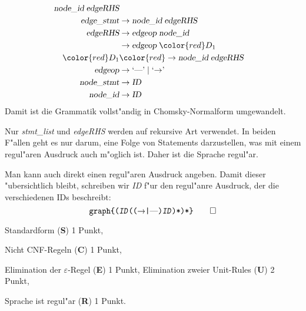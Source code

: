 \begin{loesung}
\begin{teilaufgaben}
\begin{align*}
                                \textsl{node\_id}\; \textsl{edgeRHS} \\
\textsl{edge\_stmt}&\rightarrow \textsl{node\_id}\; \textsl{edgeRHS} \\
\textsl{edgeRHS}   &\rightarrow \textsl{edgeop}\; \textsl{node\_id}\\
                   &\rightarrow \textsl{edgeop}\; \color{red}D_1\\
\color{red}D_1     &\color{red}\rightarrow \textsl{node\_id}\; \textsl{edgeRHS}\\
\textsl{edgeop}    &\rightarrow \textrm{`\text{---}'}\; |\; \textrm{`$\rightarrow$'}\; \\
\textsl{node\_stmt}&\rightarrow \textsl{ID} \\
\textsl{node\_id}  &\rightarrow \textsl{ID}
\end{align*}
Damit ist die Grammatik vollst"andig in Chomsky-Normalform umgewandelt.
\item Nur \textsl{stmt\_list} und \textsl{edgeRHS} werden auf rekursive
Art verwendet. In beiden F"allen geht es nur darum, eine Folge von
Statements darzustellen, was mit einem regul"aren Ausdruck auch m"oglich ist.
Daher ist die Sprache regul"ar.

Man kann auch direkt einen regul"aren Ausdruck angeben. Damit dieser "ubersichtlich
bleibt, schreiben wir \textsl{ID} f"ur den regul"anre Ausdruck, der die verschiedenen
IDs beschreibt:
\[
\texttt{graph\{%
(\textsl{ID}(($\rightarrow$|\textrm{---})\textsl{ID})*)*%
\}}
\qedhere
\]
\end{teilaufgaben}
\end{loesung}

\begin{bewertung}
\begin{teilaufgaben}
\item Standardform (\textbf{S}) 1 Punkt,
\item Nicht CNF-Regeln (\textbf{C}) 1 Punkt,
\item Elimination der $\varepsilon$-Regel (\textbf{E}) 1 Punkt,
Elimination zweier Unit-Rules (\textbf{U}) 2 Punkt,
\item Sprache ist regul"ar (\textbf{R}) 1 Punkt.
\end{teilaufgaben}
\end{bewertung}
